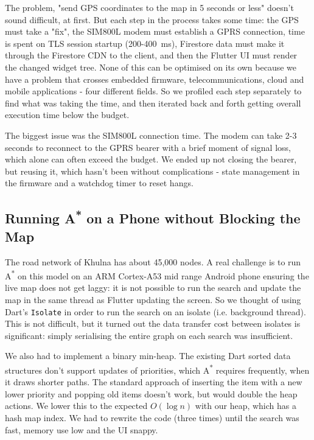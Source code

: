 \documentclass[12pt,a4paper]{report}
\begin{document}
The problem, "send GPS coordinates to the map in 5 seconds or less" doesn't sound difficult, at first. But each step in the process takes some time: the GPS must take a "fix", the SIM800L modem must establish a GPRS connection, time is spent on TLS session startup (200-400~ms), Firestore data must make it through the Firestore CDN to the client, and then the Flutter UI must render the changed widget tree. None of this can be optimised on its own because we have a problem that crosses embedded firmware, telecommunications, cloud and mobile applications - four different fields. So we profiled each step separately to find what was taking the time, and then iterated back and forth getting overall execution time below the budget.

The biggest issue was the SIM800L connection time. The modem can take 2-3 seconds to reconnect to the GPRS bearer with a brief moment of signal loss, which alone can often exceed the budget. We ended up not closing the bearer, but reusing it, which hasn't been without complications - state management in the firmware and a watchdog timer to reset hangs.

\subsection*{Running A\textsuperscript{*} on a Phone without Blocking the Map}

The road network of Khulna has about 45,000 nodes. A real challenge is to run A\textsuperscript{*} on this model on an ARM Cortex-A53 mid range Android phone ensuring the live map does not get laggy: it is not possible to run the search and update the map in the same thread as Flutter updating the screen. So we thought of using Dart's \texttt{Isolate} in order to run the search on an isolate (i.e. background thread). This is not difficult, but it turned out the data transfer cost between isolates is significant: simply serialising the entire graph on each search was insufficient.

We also had to implement a binary min-heap. The existing Dart sorted data structures don't support updates of priorities, which A\textsuperscript{*} requires frequently, when it draws shorter paths. The standard approach of inserting the item with a new lower priority and popping old items doesn't work, but would double the heap actions. We lower this to the expected $O(\log n)$ with our heap, which has a hash map index. We had to rewrite the code (three times) until the search was fast, memory use low and the UI snappy.
\end{document}
